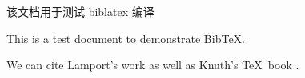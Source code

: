 \documentclass[twoside]{article}
\begin{document}
该文档用于测试 biblatex 编译

This is a test document to demonstrate BibTeX.

We can cite Lamport's work \cite{lamport1986latex} as well as Knuth's \TeX~book \cite{knuth1986texbook}.

\printbibliography
\end{document}
